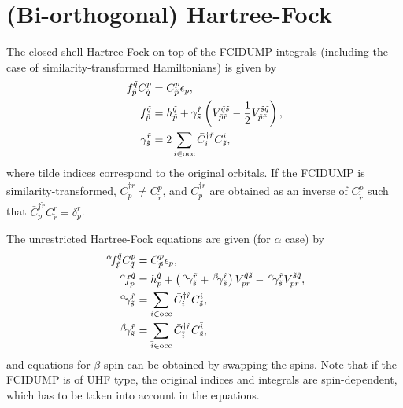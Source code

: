 \documentclass[a4paper,12pt,oneside]{book}
\newcommand{\half}{\frac{1}{2}}
\newcommand{\spa}[1]{{#1}}
\newcommand{\spb}[1]{\bar{#1}}
\newcommand{\dg}{\dagger}
\newcommand{\pre}[1]{\,#1\!}
\begin{document}
\section{(Bi-orthogonal) Hartree-Fock}
The closed-shell Hartree-Fock on top of the FCIDUMP integrals (including the case of similarity-transformed 
Hamiltonians) is given by
\begin{equation}
\begin{aligned}
f_{\tilde p}^{\tilde q} C_{\tilde q}^p &= C_{\tilde p}^p \epsilon_p,\\
f_{\tilde p}^{\tilde q} &= h_{\tilde p}^{\tilde q} + 
\gamma^{\tilde r}_{\tilde s} \left(V_{\tilde p\tilde r}^{\tilde q\tilde s} 
- \half V_{\tilde p\tilde r}^{\tilde s\tilde q}\right),\\
  \gamma^{\tilde r}_{\tilde s} &= 2\sum_{i \in \rm occ} \bar C^{\dg \tilde r}_{i} C_{\tilde s}^i,
\end{aligned}
\end{equation}
where tilde indices correspond to the original orbitals.
If the FCIDUMP is similarity-transformed, $\bar C^{\dg \tilde r}_{p} \neq C_{\tilde r}^p$,
and $\bar C^{\dg \tilde r}_{p}$ are obtained as an inverse of $C_{\tilde r}^p$ such that
$\bar C^{\dg \tilde r}_{p} C_{\tilde r}^r = \delta^{r}_{p}$.

The unrestricted Hartree-Fock equations are given (for $\alpha$ case) by
\begin{equation}
\begin{aligned}
\pre{^\alpha}f_{\tilde p}^{\tilde q} C_{\tilde q}^{\spa p} &= C_{\tilde p}^{\spa p} \epsilon_{\spa p},\\
\pre{^\alpha}f_{\tilde p}^{\tilde q} &= h_{\tilde p}^{\tilde q} +
\left(\pre{^\alpha}\gamma^{\tilde r}_{\tilde s} + \pre{^\beta}\gamma^{\tilde r}_{\tilde s}\right) 
V_{\tilde p\tilde r}^{\tilde q\tilde s}
- \pre{^\alpha}\gamma^{\tilde r}_{\tilde s}V_{\tilde p\tilde r}^{\tilde s\tilde q},\\
\pre{^\alpha}\gamma^{\tilde r}_{\tilde s} &= \sum_{\spa i \in \rm occ} \bar C^{\dg \tilde r}_{\spa i} C_{\tilde s}^{\spa i},\\
\pre{^\beta}\gamma^{\tilde r}_{\tilde s} &=  \sum_{\spb i \in \rm occ} \bar C^{\dg \tilde r}_{\spb i} C_{\tilde s}^{\spb i},
\end{aligned}
\end{equation}
and equations for $\beta$ spin can be obtained by swapping the spins.
Note that if the FCIDUMP is of UHF type, the original indices and integrals are spin-dependent,
which has to be taken into account in the equations.
\end{document}
